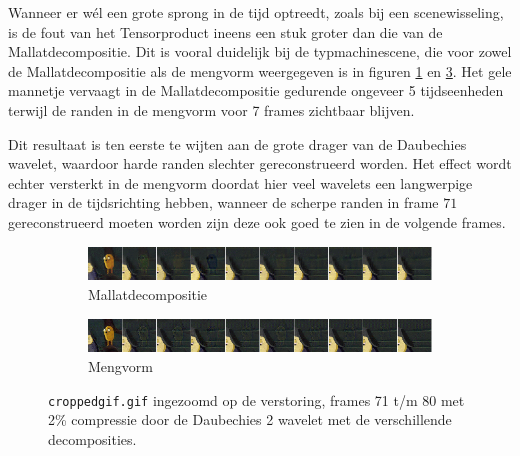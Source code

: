 Wanneer er w\'el een grote sprong in de tijd optreedt, zoals bij een scenewisseling, is de fout van 
het Tensorproduct ineens een stuk groter dan die van de Mallatdecompositie. 
Dit is vooral duidelijk bij de typmachinescene, die voor zowel de Mallatdecompositie als de mengvorm
weergegeven is in figuren \ref{fig:frames_tensor} en \ref{fig:frames_nontensor}.
Het gele mannetje vervaagt in de Mallatdecompositie gedurende ongeveer 5 tijdseenheden 
terwijl de randen in de mengvorm voor 7 frames zichtbaar blijven.

Dit resultaat is ten eerste te wijten aan de grote drager van de Daubechies wavelet, 
waardoor harde randen slechter gereconstrueerd worden.
Het effect wordt echter versterkt in de mengvorm doordat hier veel wavelets een langwerpige
drager in de tijdsrichting hebben, wanneer de scherpe randen in frame $71$ gereconstrueerd moeten worden
zijn deze ook goed te zien in de volgende frames.

\begin{figure}[h]
\centering
\begin{subfigure}{\linewidth}
\includegraphics[width=\linewidth]{plaatjes/frames_notensor_small.png}
\caption{Mallatdecompositie}
\label{fig:frames_tensor}
\end{subfigure}
\centering
\begin{subfigure}{\linewidth}
\includegraphics[width=\linewidth]{plaatjes/frames_tensor_small.png}
\caption{Mengvorm}
\label{fig:frames_nontensor}
\end{subfigure}
\caption{\texttt{croppedgif.gif} ingezoomd op de verstoring, frames 71 t/m 80 met 2\% compressie door de Daubechies 2 wavelet
met de verschillende decomposities.}
\end{figure}
